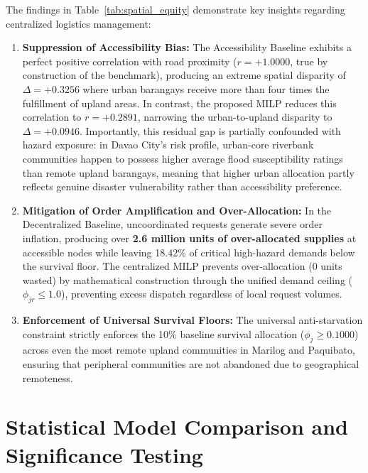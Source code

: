 The findings in Table~\ref{tab:spatial_equity} demonstrate key insights regarding centralized logistics management:
\begin{enumerate}
    \item \textbf{Suppression of Accessibility Bias:} The Accessibility Baseline exhibits a perfect positive correlation with road proximity ($r = +1.0000$, true by construction of the benchmark), producing an extreme spatial disparity of $\Delta = +0.3256$ where urban barangays receive more than four times the fulfillment of upland areas. In contrast, the proposed MILP reduces this correlation to $r = +0.2891$, narrowing the urban-to-upland disparity to $\Delta = \mathbf{+0.0946}$. Importantly, this residual gap is partially confounded with hazard exposure: in Davao City's risk profile, urban-core riverbank communities happen to possess higher average flood susceptibility ratings than remote upland barangays, meaning that higher urban allocation partly reflects genuine disaster vulnerability rather than accessibility preference.
    \item \textbf{Mitigation of Order Amplification and Over-Allocation:} In the Decentralized Baseline, uncoordinated requests generate severe order inflation, producing over \textbf{2.6 million units of over-allocated supplies} at accessible nodes while leaving 18.42\% of critical high-hazard demands below the survival floor. The centralized MILP prevents over-allocation ($0$ units wasted) by mathematical construction through the unified demand ceiling ($\phi_{jr} \le 1.0$), preventing excess dispatch regardless of local request volumes.
    \item \textbf{Enforcement of Universal Survival Floors:} The universal anti-starvation constraint strictly enforces the 10\% baseline survival allocation ($\phi_j \ge 0.1000$) across even the most remote upland communities in Marilog and Paquibato, ensuring that peripheral communities are not abandoned due to geographical remoteness.
\end{enumerate}



\section{Statistical Model Comparison and Significance Testing}
\label{sec:statistical_testing}

